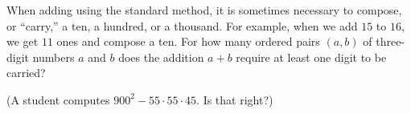 When adding using the standard method, it is sometimes necessary to compose, or ``carry,'' a ten, a hundred, or a thousand. For example, when we add $15$ to $16$, we get $11$ ones and compose a ten. For how many ordered pairs $(a,b)$ of three-digit numbers $a$ and $b$ does the addition $a+b$ require at least one digit to be carried?

(A student computes $900^2-55\cdot55\cdot45$. Is that right?)
